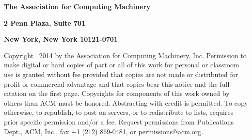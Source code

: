 \documentclass[10pt]{book}
\begin{document}












\newpage
\restoregeometry
\thispagestyle{empty}

\normalsize

\noindent \large \textbf{The Association for Computing Machinery}

\noindent \normalsize \textbf{2 Penn Plaza, Suite 701}

\noindent \textbf{New York, New York 10121-0701}

\vspace{.4cm}

\noindent Copyright \textcopyright ~2014 by the Association for Computing
Machinery, Inc. Permission to make digital or hard copies of part or all of
this work for personal or classroom use is granted without fee provided that
copies are not made or distributed for profit or commercial advantage and that
copies bear this notice and the full citation on the first page. Copyrights
for components of this work owned by others than ACM must be honored.
Abstracting with credit is permitted. To copy otherwise, to republish, to
post on servers, or to redistribute to lists, requires prior specific
permission and/or a fee. Request permissions from Publications Dept., ACM,
Inc., fax +1 (212) 869-0481, or permissions@acm.org.
\end{document}

